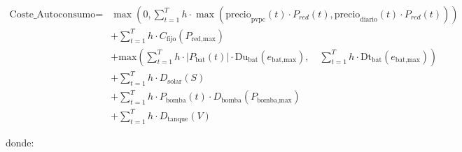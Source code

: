\begin{equation} \label{eq:cost_regulated}
	\begin{split}
		\text{Coste\_Autoconsumo} = & \max \left(0, \sum_{t=1}^{T} h \cdot \max(\text{precio}_\text{pvpc}(t) \cdot P_{red}(t), \text{precio}_\text{diario}(t) \cdot P_{red}(t)) \right)                                      \\
		                            & + \sum_{t=1}^{T} h \cdot C_\text{fijo}(P_\text{red,max})                                                                                                                               \\
		                            & + \text{max} \left( \sum_{t=1}^{T} h \cdot |P_\text{bat}(t)| \cdot \text{Du}_\text{bat}(e_\text{bat,max}), \quad \sum_{t=1}^{T} h \cdot \text{Dt}_\text{bat}(e_\text{bat,max}) \right) \\
		                            & + \sum_{t=1}^{T} h \cdot D_\text{solar}(S)                                                                                                                                             \\
		                            & + \sum_{t=1}^{T} h \cdot P_\text{bomba}(t) \cdot D_\text{bomba}(P_\text{bomba,max})                                                                                                    \\
		                            & + \sum_{t=1}^{T} h \cdot D_\text{tanque}(V)
	\end{split}
\end{equation}

donde:

